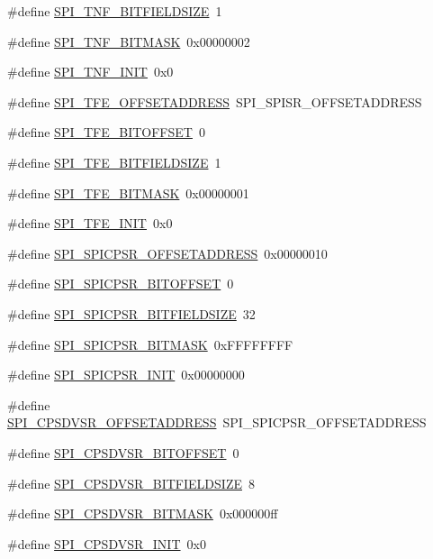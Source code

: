 \begin{DoxyCompactItemize}
\#define \hyperlink{a00573_ad654c84bd9fc5590c68d3f3541b4771c}{SPI\_\-TNF\_\-BITFIELDSIZE}~1
\item 
\#define \hyperlink{a00573_a112fca55bbacf0c97ac5feb8d001dcb4}{SPI\_\-TNF\_\-BITMASK}~0x00000002
\item 
\#define \hyperlink{a00573_ab3aa49c50909b34ccbad40561d371f6b}{SPI\_\-TNF\_\-INIT}~0x0
\item 
\#define \hyperlink{a00573_afe8c25ea4ef0e0fe0fa2179b28a697e2}{SPI\_\-TFE\_\-OFFSETADDRESS}~SPI\_\-SPISR\_\-OFFSETADDRESS
\item 
\#define \hyperlink{a00573_ad0fa7846f16b31684616c3ac4dd7a3e5}{SPI\_\-TFE\_\-BITOFFSET}~0
\item 
\#define \hyperlink{a00573_abc6b7e8d933986cc3520eb0c5ec70b00}{SPI\_\-TFE\_\-BITFIELDSIZE}~1
\item 
\#define \hyperlink{a00573_aac136ca41a3dae2e1862838501dbfde5}{SPI\_\-TFE\_\-BITMASK}~0x00000001
\item 
\#define \hyperlink{a00573_a43a92145fb41189a767dee62b473fe55}{SPI\_\-TFE\_\-INIT}~0x0
\item 
\#define \hyperlink{a00573_a32969f7dce71cf4e13f020e7b349b4d8}{SPI\_\-SPICPSR\_\-OFFSETADDRESS}~0x00000010
\item 
\#define \hyperlink{a00573_a8c6cc390e6f90292495052f014b67c5c}{SPI\_\-SPICPSR\_\-BITOFFSET}~0
\item 
\#define \hyperlink{a00573_ae54bc3c0dfcbd07df233cd16f9a358d9}{SPI\_\-SPICPSR\_\-BITFIELDSIZE}~32
\item 
\#define \hyperlink{a00573_ab8f38409540b7c2942c7cace1662d743}{SPI\_\-SPICPSR\_\-BITMASK}~0xFFFFFFFF
\item 
\#define \hyperlink{a00573_a58071373b955cac6e5ec266d74a1a5f0}{SPI\_\-SPICPSR\_\-INIT}~0x00000000
\item 
\#define \hyperlink{a00573_a74b9586113b5b2d1ede3df72d84a071d}{SPI\_\-CPSDVSR\_\-OFFSETADDRESS}~SPI\_\-SPICPSR\_\-OFFSETADDRESS
\item 
\#define \hyperlink{a00573_aa9a1b4fe02bbf65f92572ceb8c40ba94}{SPI\_\-CPSDVSR\_\-BITOFFSET}~0
\item 
\#define \hyperlink{a00573_a176e329104fe39336c062d48d464ee47}{SPI\_\-CPSDVSR\_\-BITFIELDSIZE}~8
\item 
\#define \hyperlink{a00573_a458127b1e341e4fa1258cc48117154f7}{SPI\_\-CPSDVSR\_\-BITMASK}~0x000000ff
\item 
\#define \hyperlink{a00573_a5c69fce252f4cd1ca2f495ab824c588d}{SPI\_\-CPSDVSR\_\-INIT}~0x0
\item 

\end{DoxyCompactItemize}
